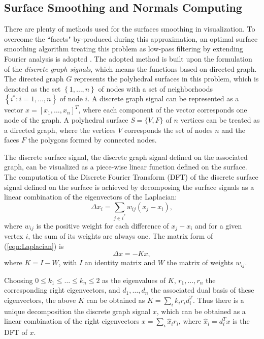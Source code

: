 \subsection{Surface Smoothing and Normals Computing}

There are plenty of methods used for the surfaces smoothing in visualization.
To overcome the ``facets" by-produced during this approximation, an optimal surface smoothing algorithm treating this problem as low-pass filtering by extending Fourier analysis is adopted \cite{Taubin1996}. %
The adopted method is built upon the formulation of the \emph{discrete graph signals}, which means the functions based on directed graph.
The directed graph $G$ represents the polyhedral surfaces in this problem, which is denoted as the set $\left\{ 1, \ldots, n \right\}$ of nodes with a set of neighborhoods $\left\{ i^{\ast}: i = 1, \ldots, n \right\}$ of node $i$. %
A discrete graph signal can be represented as a vector $x = \left[ x_1, \ldots, x_n \right]^T$, where each component of the vector corresponds one node of the graph.
A polyhedral surface $S = \{ V, F \}$ of $n$ vertices can be treated as a directed graph, where the vertices $V$ corresponds the set of nodes $n$ and the faces $F$ the polygons formed by connected nodes. %

The discrete surface signal, the discrete graph signal defined on the associated graph, can be visualized as a piece-wise linear function defined on the surface.
The computation of the Discrete Fourier Transform (DFT) of the discrete surface signal defined on the surface is achieved by decomposing the surface signals as a linear combination of the eigenvectors of the Laplacian: %
\begin{equation}
\label{eqn:Laplacian}
\Delta x_i = \sum_{j \in i^{\ast}} w_{ij} \left( x_j - x_i \right),
\end{equation}
where $w_{ij}$ is the positive weight for each difference of $x_j - x_i$ and for a given vertex $i$, the sum of its weights are always one.
The matrix form of (\ref{eqn:Laplacian}) is
\begin{equation}
\label{eqn:LaplacianMatrix}
\Delta x = - K x,
\end{equation}
where $K = I - W$, with $I$ an identity matrix and $W$ the matrix of weights $w_{ij}$.

Choosing $0 \leq k_1 \leq \ldots \leq k_n \leq 2 $ as the eigenvalues of $K$, $r_1, \ldots, r_n$ the corresponding right eigenvectors, and $d_1, \ldots, d_n$ the associated dual basis of these eigenvectors, the above $K$ can be obtained as $K = \sum_{i} k_i r_i d_i^T$. %
Thus there is a unique decomposition the discrete graph signal $x$, which can be obtained as a linear combination of the right eigenvectors $x = \sum_{i} \hat{x}_i r_i$, %
where $\hat{x}_i = d_i^T x$ is the DFT of $x$.

